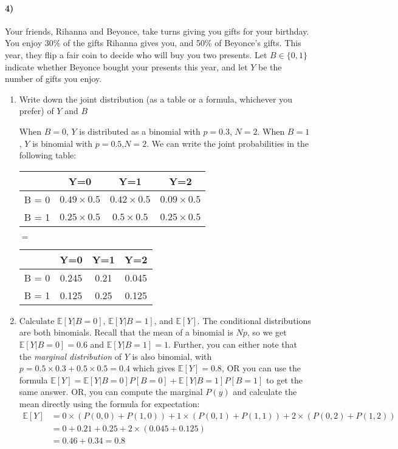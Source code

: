 \documentclass[12pt]{article}
\newcommand\EE{\mathbb{E}}
\numberwithin{equation}{section}
\numberwithin{figure}{section}
\numberwithin{table}{section}
\begin{document}
\paragraph{4)} Your friends, Rihanna and Beyonce, take turns giving you gifts for your birthday. You enjoy 30\% of the gifts Rihanna gives you, and 50\% of Beyonce's gifts. This year, they flip a fair coin to decide who will buy you two presents. Let $B\in\{0,1\}$ indicate whether Beyonce bought your presents this year, and let $Y$ be the number of gifts you enjoy.
\begin{enumerate}
\item Write down the joint distribution (as a table or a formula, whichever you prefer) of $Y$ and $B$
{\color{blue} When $B=0$, $Y$ is distributed as a binomial with $p=0.3$, $N=2$. When $B=1$, $Y$ is binomial with $p=0.5$,$N=2$. We can write the joint probabilities in the following table:
\begin{center}
\begin{tabular}{c|ccc}
 & Y=0 & Y=1 & Y=2 \\\hline
B = 0 & $0.49\times 0.5$ & $0.42 \times 0.5$  & $0.09 \times 0.5$ \\
B = 1 & $0.25\times 0.5$ & $0.5 \times 0.5$ & $0.25 \times 0.5$
\end{tabular}
\begin{center}
$=$
\begin{tabular}{c|ccc}
 & Y=0 & Y=1 & Y=2 \\\hline
B = 0 & 0.245 & 0.21  & 0.045 \\
B = 1 & 0.125 & 0.25 & 0.125
\end{tabular}
\end{center}
\end{center}
}

\item Calculate $\EE[Y|B=0]$, $\EE[Y|B=1]$, and $\EE[Y]$.
{\color{blue} The conditional distributions are both binomials. Recall that the mean of a binomial is $Np$, so we get $\EE[Y|B=0] = 0.6$ and $\EE[Y|B=1]=1$. Further, you can either note that the \emph{marginal distribution} of $Y$ is also binomial, with $p = 0.5\times 0.3 + 0.5\times0.5 = 0.4$ which gives $\EE[Y] = 0.8$, OR you can use the formula $\EE[Y] = \EE[Y|B=0]P[B=0] + \EE[Y|B=1]P[B=1]$ to get the same answer. OR, you can compute the marginal $P(y)$ and calculate the mean directly using the formula for expectation:
\begin{align*}
\EE[Y] &= 0\times (P(0,0)+P(1,0)) + 1\times(P(0,1) + P(1,1)) + 2\times(P(0,2) + P(1,2)) \\
& = 0 + 0.21+0.25 + 2\times(0.045+0.125) \\
& = 0.46 + 0.34 = 0.8
\end{align*}
}


\end{enumerate}
\end{document}
